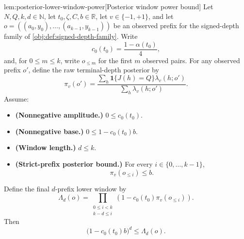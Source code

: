 \documentclass[11pt]{article}
\begin{document}
\begin{lemmav}{lem:posterior-lower-window-power}[Posterior window power bound]
Let \(N,Q,k,d\in\mathbb N\), let \(t_0,\zeta,C,b\in\mathbb R\), let \(v\in\{-1,+1\}\), and let \(o=((a_0,y_0),\ldots,(a_{k-1},y_{k-1}))\) be an observed prefix for the signed-depth family of \cref{obj:def:signed-depth-family}.  Write
\[
c_0(t_0)=\frac{1-\alpha(t_0)}{4},
\]
and, for \(0\le m\le k\), write \(o_{\le m}\) for the first \(m\) observed pairs.  For any observed prefix \(o'\), define the raw terminal-depth posterior by
\[
\pi_v(o')
=
\frac{\sum_h \mathbf 1\{J(h)=Q\}\lambda_v(h;o')}
     {\sum_h \lambda_v(h;o')}.
\]
Assume:
\begin{itemize}
\item \textbf{(Nonnegative amplitude.)} \(0\le c_0(t_0)\).
\item \textbf{(Nonnegative base.)} \(0\le 1-c_0(t_0)b\).
\item \textbf{(Window length.)} \(d\le k\).
\item \textbf{(Strict-prefix posterior bound.)} For every \(i\in\{0,\ldots,k-1\}\),
\[
\pi_v(o_{\le i})\le b.
\]
\end{itemize}
Define the final \(d\)-prefix lower window by
\[
\Lambda_d(o)
=
\prod_{\substack{0\le i<k\\ k-d\le i}}
\left(1-c_0(t_0)\pi_v(o_{\le i})\right).
\]
Then
\[
\bigl(1-c_0(t_0)b\bigr)^d\le \Lambda_d(o).
\]
\end{lemmav}
\end{document}
